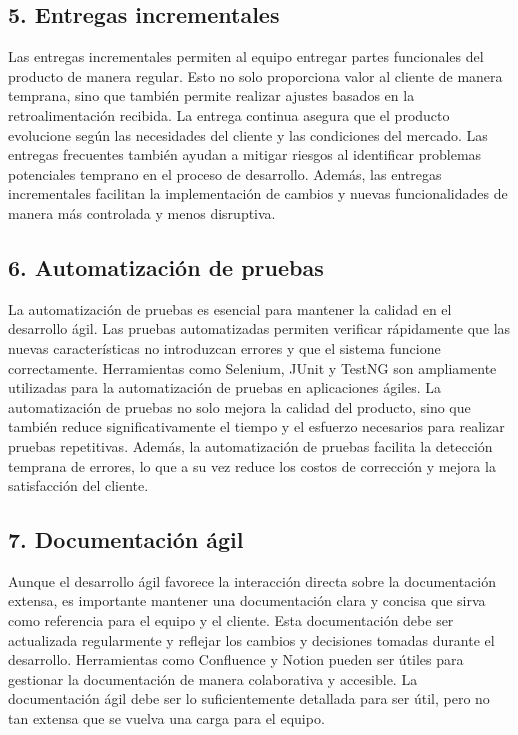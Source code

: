 \documentclass[12pt]{article}
\begin{document}
\subsection*{5. Entregas incrementales}
Las entregas incrementales permiten al equipo entregar partes funcionales del producto de manera regular. Esto no solo proporciona valor al cliente de manera temprana, sino que también permite realizar ajustes basados en la retroalimentación recibida. La entrega continua asegura que el producto evolucione según las necesidades del cliente y las condiciones del mercado. Las entregas frecuentes también ayudan a mitigar riesgos al identificar problemas potenciales temprano en el proceso de desarrollo. Además, las entregas incrementales facilitan la implementación de cambios y nuevas funcionalidades de manera más controlada y menos disruptiva.

\subsection*{6. Automatización de pruebas}
La automatización de pruebas es esencial para mantener la calidad en el desarrollo ágil. Las pruebas automatizadas permiten verificar rápidamente que las nuevas características no introduzcan errores y que el sistema funcione correctamente. Herramientas como Selenium, JUnit y TestNG son ampliamente utilizadas para la automatización de pruebas en aplicaciones ágiles. La automatización de pruebas no solo mejora la calidad del producto, sino que también reduce significativamente el tiempo y el esfuerzo necesarios para realizar pruebas repetitivas. Además, la automatización de pruebas facilita la detección temprana de errores, lo que a su vez reduce los costos de corrección y mejora la satisfacción del cliente.

\subsection*{7. Documentación ágil}
Aunque el desarrollo ágil favorece la interacción directa sobre la documentación extensa, es importante mantener una documentación clara y concisa que sirva como referencia para el equipo y el cliente. Esta documentación debe ser actualizada regularmente y reflejar los cambios y decisiones tomadas durante el desarrollo. Herramientas como Confluence y Notion pueden ser útiles para gestionar la documentación de manera colaborativa y accesible. La documentación ágil debe ser lo suficientemente detallada para ser útil, pero no tan extensa que se vuelva una carga para el equipo.
\end{document}

